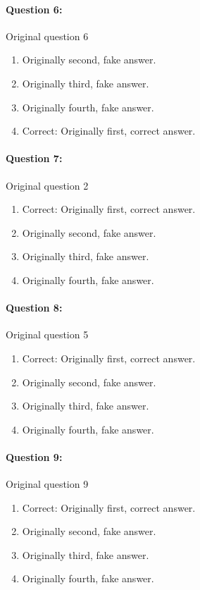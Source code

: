 \documentclass[9pt, twoside, twocolumn]{extarticle}
\begin{document}
\paragraph{Question 6:}
Original question 6

\begin{enumerate}[label=\textbf{{\Alph*}},labelindent=0pt, labelsep=1.5em, parsep=0.2em]
\item Originally second, fake answer.
\item Originally third, fake answer.
\item Originally fourth, fake answer.
\item Correct: Originally first, correct answer.
\end{enumerate}
\paragraph{Question 7:}
Original question 2

\begin{enumerate}[label=\textbf{{\Alph*}},labelindent=0pt, labelsep=1.5em, parsep=0.2em]
\item Correct: Originally first, correct answer.
\item Originally second, fake answer.
\item Originally third, fake answer.
\item Originally fourth, fake answer.
\end{enumerate}
\paragraph{Question 8:}
Original question 5

\begin{enumerate}[label=\textbf{{\Alph*}},labelindent=0pt, labelsep=1.5em, parsep=0.2em]
\item Correct: Originally first, correct answer.
\item Originally second, fake answer.
\item Originally third, fake answer.
\item Originally fourth, fake answer.
\end{enumerate}
\paragraph{Question 9:}
Original question 9

\begin{enumerate}[label=\textbf{{\Alph*}},labelindent=0pt, labelsep=1.5em, parsep=0.2em]
\item Correct: Originally first, correct answer.
\item Originally second, fake answer.
\item Originally third, fake answer.
\item Originally fourth, fake answer.
\end{enumerate}
\end{document}
